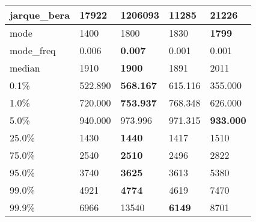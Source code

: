 \begin{table}[H]
\begin{tabular}{|l|m{10em}|m{10em}|m{10em}|m{10em}|}
\hline jarque\_bera & 17922 & \cellcolor[rgb]{0.9, 0.54, 0.52} 1206093 & 11285 & \bfseries 21226 \\
\hline mode & 1400 & 1800 & \cellcolor[rgb]{0.9, 0.54, 0.52} 1830 & \bfseries 1799 \\
\hline mode\_freq & 0.006 & \bfseries 0.007 & \cellcolor[rgb]{0.9, 0.54, 0.52} 0.001 & 0.001 \\
\hline median & 1910 & \bfseries 1900 & 1891 & \cellcolor[rgb]{0.9, 0.54, 0.52} 2011 \\
\hline 0.1\% & 522.890 & \bfseries 568.167 & 615.116 & \cellcolor[rgb]{0.9, 0.54, 0.52} 355.000 \\
\hline 1.0\% & 720.000 & \bfseries 753.937 & 768.348 & \cellcolor[rgb]{0.9, 0.54, 0.52} 626.000 \\
\hline 5.0\% & 940.000 & \cellcolor[rgb]{0.9, 0.54, 0.52} 973.996 & 971.315 & \bfseries 933.000 \\
\hline 25.0\% & 1430 & \bfseries 1440 & 1417 & \cellcolor[rgb]{0.9, 0.54, 0.52} 1510 \\
\hline 75.0\% & 2540 & \bfseries 2510 & 2496 & \cellcolor[rgb]{0.9, 0.54, 0.52} 2822 \\
\hline 95.0\% & 3740 & \bfseries 3625 & 3613 & \cellcolor[rgb]{0.9, 0.54, 0.52} 5380 \\
\hline 99.0\% & 4921 & \bfseries 4774 & 4619 & \cellcolor[rgb]{0.9, 0.54, 0.52} 7470 \\
\hline 99.9\% & 6966 & \cellcolor[rgb]{0.9, 0.54, 0.52} 13540 & \bfseries 6149 & 8701 \\
\hline
\end{tabular}
\end{table}
